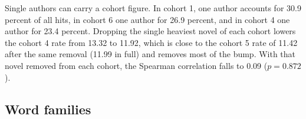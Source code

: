 \documentclass[11pt]{article}
\begin{document}
Single authors can carry a cohort figure. In cohort 1, one author accounts for 30.9 percent of all hits, in cohort 6 one author for 26.9 percent, and in cohort 4 one author for 23.4 percent.
Dropping the single heaviest novel of each cohort lowers the cohort 4 rate from 13.32 to 11.92, which is close to the cohort 5 rate of 11.42 after the same removal (11.99 in full) and removes most of the bump.
With that novel removed from each cohort, the Spearman correlation falls to 0.09 ($p=0.872$).

\subsection{Word families}
\end{document}
